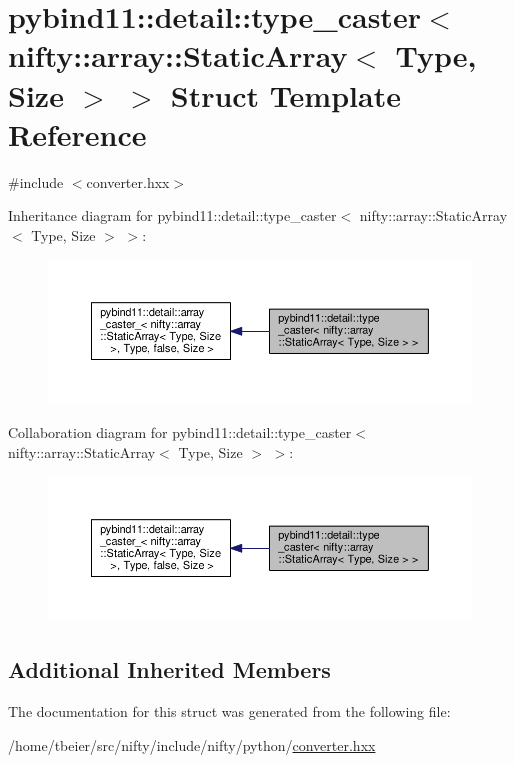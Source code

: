 \hypertarget{structpybind11_1_1detail_1_1type__caster_3_01nifty_1_1array_1_1StaticArray_3_01Type_00_01Size_01_4_01_4}{}\section{pybind11\+:\+:detail\+:\+:type\+\_\+caster$<$ nifty\+:\+:array\+:\+:Static\+Array$<$ Type, Size $>$ $>$ Struct Template Reference}
\label{structpybind11_1_1detail_1_1type__caster_3_01nifty_1_1array_1_1StaticArray_3_01Type_00_01Size_01_4_01_4}


{\ttfamily \#include $<$converter.\+hxx$>$}



Inheritance diagram for pybind11\+:\+:detail\+:\+:type\+\_\+caster$<$ nifty\+:\+:array\+:\+:Static\+Array$<$ Type, Size $>$ $>$\+:\nopagebreak
\begin{figure}[H]
\begin{center}
\leavevmode
\includegraphics[width=350pt]{structpybind11_1_1detail_1_1type__caster_3_01nifty_1_1array_1_1StaticArray_3_01Type_00_01Size_01_4_01_4__inherit__graph}
\end{center}
\end{figure}


Collaboration diagram for pybind11\+:\+:detail\+:\+:type\+\_\+caster$<$ nifty\+:\+:array\+:\+:Static\+Array$<$ Type, Size $>$ $>$\+:\nopagebreak
\begin{figure}[H]
\begin{center}
\leavevmode
\includegraphics[width=350pt]{structpybind11_1_1detail_1_1type__caster_3_01nifty_1_1array_1_1StaticArray_3_01Type_00_01Size_01_4_01_4__coll__graph}
\end{center}
\end{figure}
\subsection*{Additional Inherited Members}


The documentation for this struct was generated from the following file\+:\begin{DoxyCompactItemize}
\item 
/home/tbeier/src/nifty/include/nifty/python/\hyperlink{converter_8hxx}{converter.\+hxx}\end{DoxyCompactItemize}
